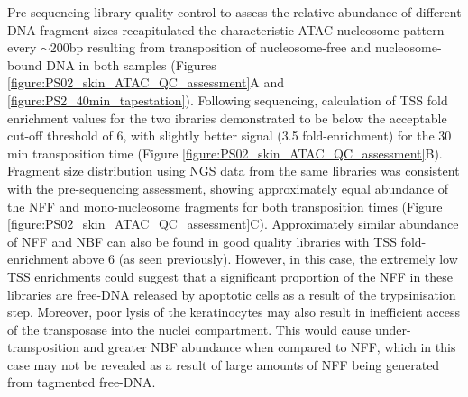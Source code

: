  Pre-sequencing library quality control to assess the relative abundance of different DNA fragment sizes recapitulated the characteristic ATAC nucleosome pattern every $\sim$200bp resulting from transposition of nucleosome-free and nucleosome-bound DNA in both samples (Figures \ref{figure:PS02_skin_ATAC_QC_assessment}A and \ref{figure:PS2_40min_tapestation}). Following sequencing, calculation of TSS fold enrichment values for the two ibraries demonstrated to be below the acceptable cut-off threshold of 6, with slightly better signal (3.5 fold-enrichment) for the 30 min transposition time (Figure \ref{figure:PS02_skin_ATAC_QC_assessment}B). Fragment size distribution using NGS data from the same libraries was consistent with the pre-sequencing assessment, showing approximately equal abundance of the NFF and mono-nucleosome fragments for both transposition times (Figure \ref{figure:PS02_skin_ATAC_QC_assessment}C). Approximately similar abundance of NFF and NBF can also be found in good quality libraries with TSS fold-enrichment above 6 (as seen previously). However, in this case, the extremely low TSS enrichments could suggest that a significant proportion of the NFF in these libraries are free-DNA released by apoptotic cells as a result of the trypsinisation step. Moreover, poor lysis of the keratinocytes may also result in inefficient access of the transposase into the nuclei compartment. This would cause under-transposition and greater NBF abundance when compared to NFF, which in this case may not be revealed as a result of large amounts of NFF being generated from tagmented free-DNA.



